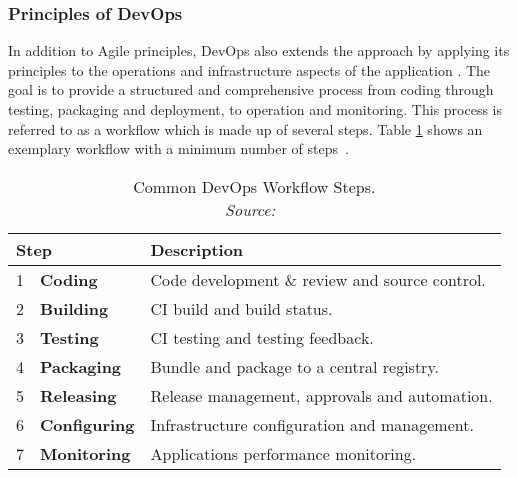         \subsubsection{Principles of DevOps}\label{ssec::devops_princibles}
        In addition to Agile principles, DevOps also extends the  approach by applying its principles to the operations and infrastructure aspects of the application \cite{effective_devops}. The goal is to provide a structured and comprehensive process from coding through testing, packaging and deployment, to operation and monitoring. This process is referred to as a workflow which is made up of several steps. Table \ref{tab::devops_steps} shows an exemplary workflow with a minimum number of steps~\cite{base_devops}.

        \begin{table}[]
            \centering
            \begin{tabularx}{0.85\textwidth}{llX}
                \multicolumn{2}{l}{Step} & Description \\ \midrule\midrule
                1 & \textbf{Coding}& Code development \& review and source control.  \\
                2 & \textbf{Building}& \acs{CI} build and build status.  \\
                3 & \textbf{Testing}& \acs{CI} testing and testing feedback.  \\
                4 & \textbf{Packaging}& Bundle and package to a central registry.  \\
                5 & \textbf{Releasing}& Release management, approvals and automation.  \\
                6 & \textbf{Configuring}& Infrastructure configuration and management.  \\
                7 & \textbf{Monitoring}& Applications performance monitoring.  \\
            \end{tabularx}
            \caption{Common DevOps Workflow Steps. \\\textit{Source:~\cite{base_devops}}}\label{tab::devops_steps}
        \end{table}

